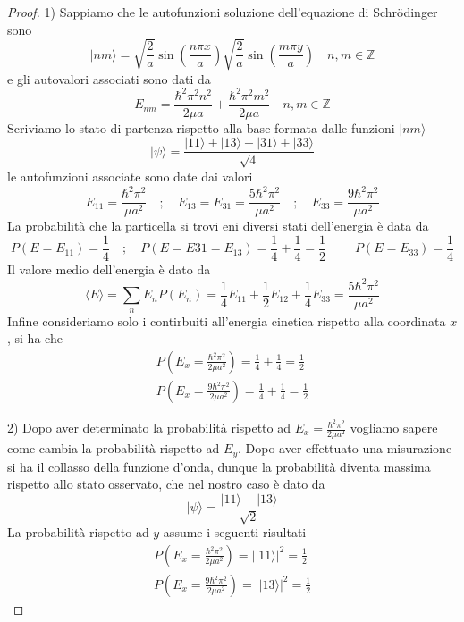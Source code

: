 \begin{proof}
	1) Sappiamo che le autofunzioni soluzione dell'equazione di Schr\"odinger sono 
	\begin{equation*}
		|nm \rangle = \sqrt{\frac{2}{a}} \sin\left(\frac{n\pi x }{a} \right)\sqrt{\frac{2}{a}}\sin \left( \frac{m \pi y}{a}\right)  \quad n,m \in \mathbb{Z}
	\end{equation*}
	e gli autovalori associati sono dati da 
	\begin{equation*}
		E_{nm} = \frac{\hbar^2 \pi^2 n^2}{2\mu a} + \frac{\hbar^2 \pi ^2 m^2}{2 \mu a} \quad n,m \in \mathbb{Z}
	\end{equation*}
Scriviamo lo stato di partenza rispetto alla base formata dalle funzioni $|nm \rangle$
\begin{equation*}
	|\psi\rangle = \frac{|11 \rangle  + |13\rangle + |31\rangle + |33 \rangle }{\sqrt{4}} 
\end{equation*}
le autofunzioni associate sono date dai valori
\begin{equation*}
	E_{11} = \frac{\hbar^2 \pi ^2}{\mu a^2} \quad;\quad  E_{13} = E_{31}=\frac{5\hbar^2 \pi ^2}{\mu a^2}\quad ; \quad E_{33} = \frac{9\hbar^2 \pi^2}{\mu  a^2}
\end{equation*}
La probabilit\`a che la particella si trovi eni diversi stati dell'energia \`e data da 
\begin{equation*}
	P(E=E_{11}) = \frac{1}{4} \quad ; \quad P(E=E{31}=E_{13}) = \frac{1}{4} + \frac{1}{4} = \frac{1}{2} \quad \; \quad P(E=E_{33}) = \frac{1}{4}
\end{equation*}
Il valore medio dell'energia \`e dato da 
\begin{equation*}
	\langle E \rangle = \sum_{n}E_{n}P(E_n) = \frac{1}{4}E_{11} + \frac{1}{2}E_{12} +\frac{1}{4}E_{33} = \frac{5 \hbar^2 \pi^2}{\mu a^2}
\end{equation*}
Infine consideriamo solo i contirbuiti all'energia cinetica rispetto alla coordinata $x$, si ha che 
\begin{align*}
	P \left (E_x = \frac{\hbar^2 \pi^2}{2 \mu a^2}\right ) = \frac{1}{4} + \frac{1}{4} = \frac{1}{2} \\[0.5cm]
	P \left (E_x = \frac{9 \hbar^2 \pi^2}{2\mu a^2}\right )  = \frac{1}{4} + \frac{1}{4} = \frac{1}{2}
\end{align*}
\newpage

2) Dopo aver determinato la probabilit\`a rispetto ad $E_x = \frac{\hbar^2 \pi^2}{2 \mu a^2} $ vogliamo sapere come cambia la probabilit\`a rispetto ad $E_y$.  Dopo aver effettuato una misurazione si ha il collasso della funzione d'onda, dunque la probabilit\`a diventa massima rispetto allo stato osservato, che nel nostro caso \`e dato da 
\begin{equation*}
	|\psi \rangle = \frac{|11 \rangle + |13 \rangle }{\sqrt{2}}
\end{equation*}
La probabilit\`a rispetto ad $y$ assume i seguenti risultati
\begin{align*}
	P \left (E_x = \frac{\hbar^2 \pi^2}{2 \mu a^2}\right ) = ||11\rangle|^2 = \frac{1}{2} \\[0.3cm]
		P \left (E_x = \frac{9 \hbar^2 \pi^2}{2\mu a^2}\right )  = ||13\rangle |^2 = \frac{1}{2}
\end{align*}


\end{proof}
